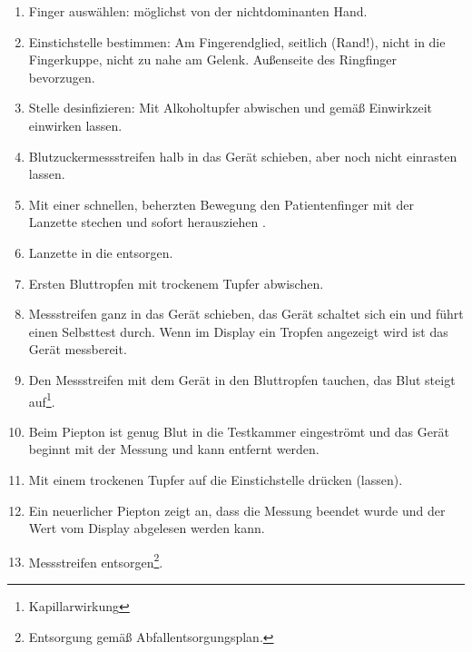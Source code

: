 {
\begin{enumerate}
  \item Finger auswählen: möglichst von der nichtdominanten
  Hand.
  \item Einstichstelle bestimmen: Am Fingerendglied,
  seitlich (Rand!), nicht in die Fingerkuppe, nicht zu nahe
  am Gelenk. Außenseite des Ringfinger bevorzugen.
  \item Stelle desinfizieren: Mit Alkoholtupfer abwischen
  und gemäß Einwirkzeit einwirken lassen.
  \item Blutzuckermessstreifen halb in das Gerät schieben,
  aber noch nicht einrasten lassen.
  \item Mit einer schnellen, beherzten Bewegung den
  Patientenfinger mit der Lanzette stechen und sofort
  herausziehen .
  \item Lanzette in die  entsorgen.
  \item Ersten Bluttropfen mit trockenem Tupfer abwischen.
  \item Messstreifen ganz in das Gerät schieben, das Gerät
  schaltet sich ein und führt einen Selbsttest durch. Wenn
  im Display ein Tropfen angezeigt wird ist das Gerät
  messbereit.
  \item Den Messstreifen mit dem Gerät in den Bluttropfen
  tauchen, das Blut steigt auf\footnote{Kapillarwirkung}.
  \item Beim Piepton ist genug Blut in die Testkammer
  eingeströmt und das Gerät beginnt mit der Messung und kann
  entfernt werden. 
  \item Mit einem trockenen Tupfer auf die Einstichstelle
  drücken (lassen).
  \item Ein neuerlicher Piepton zeigt an, dass die Messung
  beendet wurde und der Wert vom Display abgelesen
  werden kann. 
  \item Messstreifen entsorgen\footnote{Entsorgung gemäß
  Abfallentsorgungsplan. }.
\end{enumerate}
}{

}



